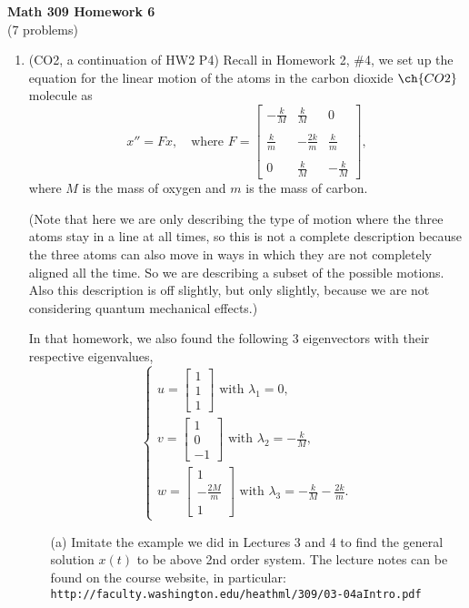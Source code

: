 \documentclass[11pt]{article}
\theoremstyle{definition}
\begin{document}
\begin{center}
\textbf{Math 309 Homework 6}\\
(7 problems)
\end{center}



\begin{enumerate}[leftmargin=*]

\item (CO2, a continuation of HW2 P4) Recall in Homework 2, \#4, we set up the equation  for  the linear motion of the atoms in the carbon dioxide $\ch{CO2}$ molecule as 
\[
x''= Fx, \quad \text{where }
F = \left[\begin{array}{ccc}
-\frac{k}{M}& \frac{k}{M} &0\\\\
\frac{k}{m}&-\frac{2k}{m}&\frac{k}{m} \\\\
0&\frac{k}{M} &-\frac{k}{M}
\end{array}\right],
\]
where $M$ is the mass of oxygen and $m$ is the mass of carbon. 

 (Note that here we are only describing the type of motion where the  three atoms stay in a line at all times, so this is not a complete description because the three atoms can also move in ways in which they are not completely aligned all the time.  So we are describing a subset of the possible motions.  Also this description is off slightly, but only slightly, because we are not considering quantum mechanical effects.) 
 
 In that homework, we also found the following 3 eigenvectors with their respective eigenvalues,
\[
\begin{cases}
u= \left[\begin{array}{c}
1\\
1\\
1
\end{array}\right] \text{ with } \lambda_1=0,\\
 v= \left[\begin{array}{c}
1\\
0\\
-1
\end{array}\right]\text{ with } \lambda_2=-\frac{k}{M}, \\
w= \left[\begin{array}{c}
1\\
-\frac{2M}{m}\\
1
\end{array}\right] \text{ with } \lambda_3=-\frac{k}{M}-\frac{2k}{m}.
\end{cases}
\]
\begin{itemize}
\item[(a)] Imitate the example we did in Lectures 3 and 4 to find the general solution $x(t)$ to be above 2nd order system.  The lecture notes can be found on the course website, in particular:
 \verb+http://faculty.washington.edu/heathml/309/03-04aIntro.pdf+
 

\end{itemize}
\end{enumerate}
\end{document}
